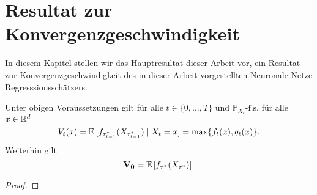 \chapter{Resultat zur Konvergenzgeschwindigkeit}
\label{chap:3}

In diesem Kapitel stellen wir das Hauptresultat dieser Arbeit vor, ein Resultat zur Konvergenzgeschwindigkeit des in dieser Arbeit vorgestellten Neuronale Netze Regresssionsschätzers.

\begin{thm}\label{optstop}
    Unter obigen Voraussetzungen gilt für alle $t \in \{0,\dots,T\}$ und $\mathds{P}_{X_t}\text{-f.s.}$ für alle $x \in \mathbb{R}^d$
    \begin{equation}\label{eq:1}
        V_t (x) = \mathbb{E}\, [f_{\tau_{t-1}^*}(X_{\tau_{t-1}^*}) \mid X_t = x] = \max\{f_t(x),q_t(x)\}.
    \end{equation}
    Weiterhin gilt
    \begin{equation}\label{eq:2}
        \mathbf{V_0} = \mathbb{E}\, [f_{\tau^*}(X_{\tau^*})].
    \end{equation}
\end{thm}
\begin{proof}

\end{proof}